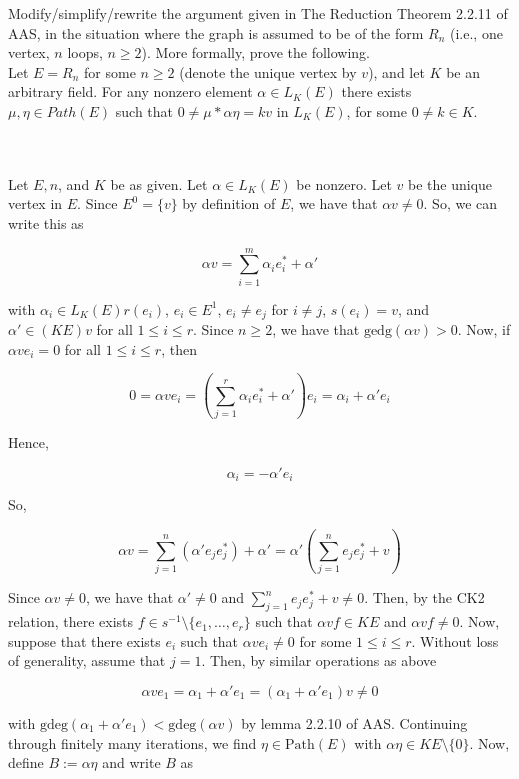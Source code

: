 Modify/simplify/rewrite the argument given in The Reduction Theorem 2.2.11 of AAS, in the situation
where the graph is assumed to be of the form $R_n$ (i.e., one vertex, $n$ loops, $n\geq2$). More
formally, prove the following.\\
Let $E=R_n$ for some $n\geq2$ (denote the unique vertex by $v$), and let $K$ be an arbitrary field. For
any nonzero element $\alpha\in L_K(E)$ there exists $\mu,\eta\in Path(E)$ such that
$0\neq\mu*\alpha\eta =kv$ in $L_K(E)$, for some $0\neq k\in K$.\\\\

\begin{solution}\renewcommand{\qedsymbol}{}\ \\
    Let $E, n$, and $K$ be as given. Let $\alpha\in L_K(E)$ be nonzero. Let $v$ be the unique vertex in
    $E$. Since $E^0=\{v\}$ by definition of $E$, we have that $\alpha v\neq0$. So, we can write this as
    
    $$\alpha v=\sum_{i=1}^m\alpha_ie_i^*+\alpha'$$

    with $\alpha_i\in L_K(E)r(e_i)$, $e_i\in E^1$, $e_i\neq e_j$ for $i\neq j$, $s(e_i)=v$, and
    $\alpha'\in(KE)v$ for all $1\leq i\leq r$. Since $n\geq 2$, we have that $\text{gedg}(\alpha v)>0$. Now,
    if $\alpha ve_i=0$ for all $1\leq i\leq r$, then
    
    $$0=\alpha ve_i=(\sum_{j=1}^r\alpha_ie_i^*+\alpha')e_i=\alpha_i+\alpha'e_i$$

    Hence,

    $$\alpha_i=-\alpha'e_i$$

    So,

    $$\alpha v=\sum_{j=1}^n(\alpha'e_je_j^*)+\alpha'=\alpha'(\sum_{j=1}^ne_je_j^*+v)$$

    Since $\alpha v\neq 0$, we have that $\alpha'\neq0$ and $\sum_{j=1}^ne_je_j^*+v\neq0$. Then, by the
    CK2 relation, there exists $f\in s^{-1}\setminus\{e_1,\ldots,e_r\}$ such that $\alpha vf\in KE$ and
    $\alpha vf\neq0$. Now, suppose that there exists $e_i$ such that $\alpha ve_i\neq 0$ for some
    $1\leq i\leq r$. Without loss of generality, assume that $j=1$. Then, by similar operations as above

    $$\alpha ve_1=\alpha_1+\alpha'e_1=(\alpha_1+\alpha'e_1)v\neq0$$

    with $\text{gdeg}(\alpha_1+\alpha'e_1)<\text{gdeg}(\alpha v)$ by lemma 2.2.10 of AAS. Continuing
    through finitely many iterations, we find $\eta\in\text{Path}(E)$ with
    $\alpha\eta\in KE\setminus\{0\}$. Now, define $B:=\alpha\eta$ and write $B$ as


\end{solution}
